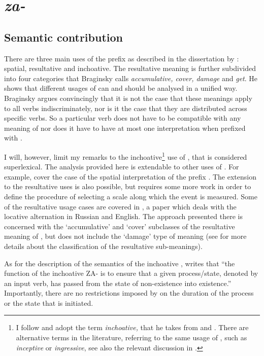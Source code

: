 \section{\textit{za-}}\label{subsection:semantics:za}
\subsection{Semantic contribution}
There are three main uses of the prefix  as described in the dissertation by \citet{Braginsky:08}: spatial, resultative and inchoative. The resultative meaning is further subdivided into four categories that Braginsky calls \textit{accumulative, cover, damage} and \textit{get}. He shows that different usages of  can and should be analysed in a unified way. Braginsky argues convincingly that it is not the case that these meanings apply to all verbs indiscriminately, nor is it the case that they are distributed across specific verbs. So a particular verb does not have to be compatible with any meaning of  nor does it have to have at most one interpretation when prefixed with .

I will, however, limit my remarks to the inchoative\footnote{I follow \citet{Braginsky:08} and adopt the term \textit{inchoative,} that he takes from \citet{Zemskaja:55} and \citet{Zaliznjak:95}. There are alternative terms in the literature, referring to the same usage of , such as \textit{inceptive} or \textit{ingressive}, see also the relevant discussion in \citealt{Maslov:65}.} use of , that is considered superlexical. The analysis provided here is extendable to other uses of . For example, \cite{ZinovaOsswald:paper} cover the case of the spatial interpretation of the prefix . The extension to the resultative uses is also possible, but requires some more work in order to define the procedure of selecting a scale along which the event is measured. Some of the resultative usage cases are covered in \citet{Zinova:14}, a paper which deals with the locative alternation in Russian and English. The approach presented there is concerned with the `accumulative' and `cover' subclasses of the resultative meaning of , but does not include the `damage' type of meaning (see \citealt{Braginsky:08} for more details about the classification of the resultative sub-meanings).

As for the description of the semantics of the inchoative , \citet{Braginsky:08} writes \citep[following][]{Sheljakin:69} that ``the function of the inchoative ZA- is to ensure that a given process\slash state, denoted by an input verb, has passed from the state of non-existence into existence.'' Importantly, there are no restrictions imposed by  on the duration of the process or the state that is initiated.

